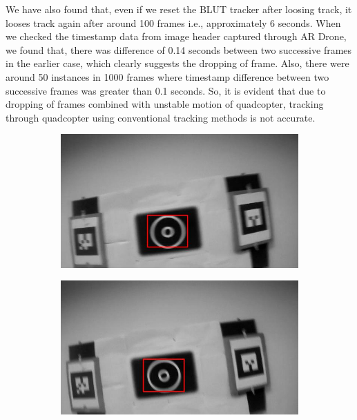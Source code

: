 \documentclass[runningheads]{llncs}
\begin{document}
We have also found that, even if we reset the BLUT tracker after loosing track,
it looses track again after around 100 frames i.e., approximately 6 seconds.
When we checked the timestamp data from image header captured through AR Drone,
we found that, there was difference of 0.14 seconds between two successive
frames in the earlier case, which clearly suggests the dropping of frame. Also,
there were around 50 instances in 1000 frames where timestamp difference between two
successive frames was greater than 0.1 seconds. So, it is evident that
due to dropping of frames combined with unstable motion of quadcopter, tracking
through quadcopter using conventional tracking methods is not accurate.

\begin{figure}
\begin{subfigure}[b]{.19\textwidth}
\includegraphics[width=\linewidth]{BLUT_output_00/2.jpg}
\end{subfigure}
\begin{subfigure}[b]{.19\textwidth}
\includegraphics[width=\linewidth]{BLUT_output_00/3.jpg}
\end{subfigure}

\end{figure}
\end{document}
